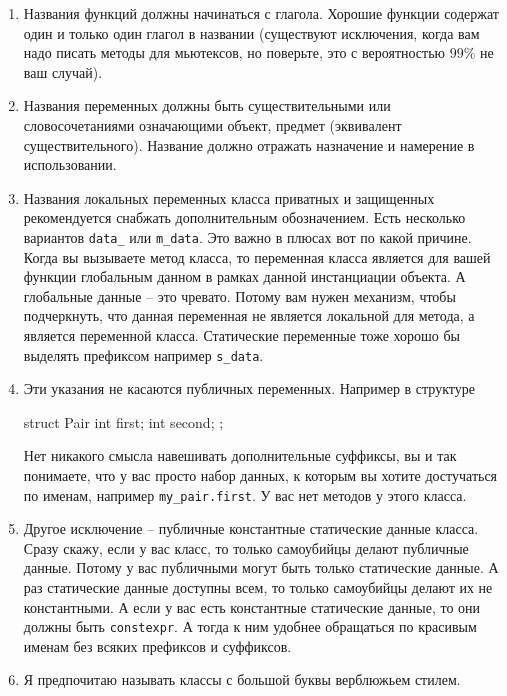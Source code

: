 \documentclass{article}
\begin{document}
\begin{enumerate}
\item Названия функций должны начинаться с глагола. Хорошие функции содержат один и только один глагол в названии (существуют исключения, когда вам надо писать методы для мьютексов, но поверьте, это с вероятностью $99\%$ не ваш случай).

\item Названия переменных должны быть существительными или словосочетаниями означающими объект, предмет (эквивалент существительного). Название должно отражать назначение и намерение в использовании.

\item Названия локальных переменных класса приватных и защищенных рекомендуется снабжать дополнительным обозначением. Есть несколько вариантов \verb"data_" или \verb"m_data". Это важно в плюсах вот по какой причине. Когда вы вызываете метод класса, то переменная класса является для вашей функции глобальным данном в рамках данной инстанциации объекта. А глобальные данные -- это чревато. Потому вам нужен механизм, чтобы подчеркнуть, что данная переменная не является локальной для метода, а является переменной класса. Статические переменные тоже хорошо бы выделять префиксом например \verb"s_data".

\item Эти указания не касаются публичных переменных. Например в структуре
\begin{cppcode}
struct Pair {
  int first;
  int second;
};
\end{cppcode}
Нет никакого смысла навешивать дополнительные суффиксы, вы и так понимаете, что у вас просто набор данных, к которым вы хотите достучаться по именам, например \verb"my_pair.first". У вас нет методов у этого класса.

\item Другое исключение -- публичные константные статические данные класса. Сразу скажу, если у вас класс, то только самоубийцы делают публичные данные. Потому у вас публичными могут быть только статические данные. А раз статические данные доступны всем, то только самоубийцы делают их не константными. А если у вас есть константные статические данные, то они должны быть \verb"constexpr". А тогда к ним удобнее обращаться по красивым именам без всяких префиксов и суффиксов.

\item Я предпочитаю называть классы с большой буквы верблюжьем стилем.
\end{enumerate}
\end{document}
